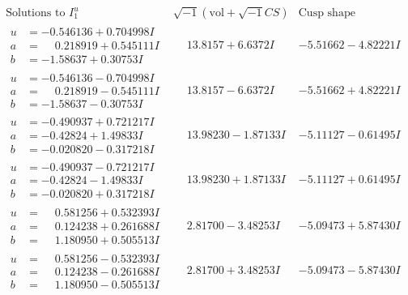 \documentclass[1p]{elsarticle_modified}
\theoremstyle{definition}
\newcommand{\I}{\sqrt{-1}}
\begin{document}
$$\begin{array}{c|c|c}  
\text{Solutions to }I^u_{1}& \I (\text{vol} + \sqrt{-1}CS) & \text{Cusp shape}\\
 \hline 
\begin{aligned}
u &= -0.546136 + 0.704998 I \\
a &= \phantom{-}0.218919 + 0.545111 I \\
b &= -1.58637 + 0.30753 I\end{aligned}
 & \phantom{-}13.8157 + 6.6372 I & -5.51662 - 4.82221 I \\ \hline\begin{aligned}
u &= -0.546136 - 0.704998 I \\
a &= \phantom{-}0.218919 - 0.545111 I \\
b &= -1.58637 - 0.30753 I\end{aligned}
 & \phantom{-}13.8157 - 6.6372 I & -5.51662 + 4.82221 I \\ \hline\begin{aligned}
u &= -0.490937 + 0.721217 I \\
a &= -0.42824 + 1.49833 I \\
b &= -0.020820 - 0.317218 I\end{aligned}
 & \phantom{-}13.98230 - 1.87133 I & -5.11127 - 0.61495 I \\ \hline\begin{aligned}
u &= -0.490937 - 0.721217 I \\
a &= -0.42824 - 1.49833 I \\
b &= -0.020820 + 0.317218 I\end{aligned}
 & \phantom{-}13.98230 + 1.87133 I & -5.11127 + 0.61495 I \\ \hline\begin{aligned}
u &= \phantom{-}0.581256 + 0.532393 I \\
a &= \phantom{-}0.124238 + 0.261688 I \\
b &= \phantom{-}1.180950 + 0.505513 I\end{aligned}
 & \phantom{-}2.81700 - 3.48253 I & -5.09473 + 5.87430 I \\ \hline\begin{aligned}
u &= \phantom{-}0.581256 - 0.532393 I \\
a &= \phantom{-}0.124238 - 0.261688 I \\
b &= \phantom{-}1.180950 - 0.505513 I\end{aligned}
 & \phantom{-}2.81700 + 3.48253 I & -5.09473 - 5.87430 I \\ \hline\begin{aligned}

\end{aligned}
\end{array}$$
\end{document}
